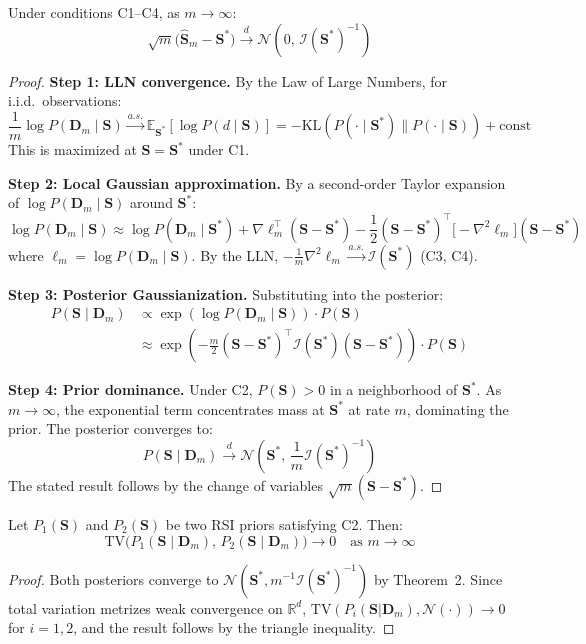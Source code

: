 \begin{theorem}
\label{thm:bvm_complete}
Under conditions C1--C4, as $m \to \infty$:
\[
  \sqrt{m}\bigl(\hat{\mathbf{S}}_m - \mathbf{S}^*\bigr)
  \xrightarrow{d} \mathcal{N}\!\left(0,\, \mathcal{I}(\mathbf{S}^*)^{-1}\right)
\]
\end{theorem}

\begin{proof}
\textbf{Step 1: LLN convergence.}
By the Law of Large Numbers, for i.i.d.\ observations:
\[
  \frac{1}{m} \log P(\mathbf{D}_m \mid \mathbf{S})
  \xrightarrow{a.s.} \mathbb{E}_{\mathbf{S}^*}[\log P(d \mid \mathbf{S})]
  = -\mathrm{KL}(P(\cdot \mid \mathbf{S}^*) \| P(\cdot \mid \mathbf{S}))
  + \text{const}
\]
This is maximized at $\mathbf{S} = \mathbf{S}^*$ under C1.

\textbf{Step 2: Local Gaussian approximation.}
By a second-order Taylor expansion of $\log P(\mathbf{D}_m \mid \mathbf{S})$
around $\mathbf{S}^*$:
\[
  \log P(\mathbf{D}_m \mid \mathbf{S}) \approx
  \log P(\mathbf{D}_m \mid \mathbf{S}^*)
  + \nabla \ell_m^\top (\mathbf{S} - \mathbf{S}^*)
  - \frac{1}{2}(\mathbf{S} - \mathbf{S}^*)^\top
  \bigl[-\nabla^2 \ell_m\bigr]
  (\mathbf{S} - \mathbf{S}^*)
\]
where $\ell_m = \log P(\mathbf{D}_m \mid \mathbf{S})$.
By the LLN, $-\frac{1}{m}\nabla^2 \ell_m \xrightarrow{a.s.}
\mathcal{I}(\mathbf{S}^*)$ (C3, C4).

\textbf{Step 3: Posterior Gaussianization.}
Substituting into the posterior:
\begin{align*}
  P(\mathbf{S} \mid \mathbf{D}_m)
  &\propto \exp\!\left(\log P(\mathbf{D}_m \mid \mathbf{S})\right) \cdot P(\mathbf{S}) \\
  &\approx \exp\!\left(-\frac{m}{2}(\mathbf{S}-\mathbf{S}^*)^\top
    \mathcal{I}(\mathbf{S}^*)
    (\mathbf{S}-\mathbf{S}^*)\right) \cdot P(\mathbf{S})
\end{align*}

\textbf{Step 4: Prior dominance.}
Under C2, $P(\mathbf{S}) > 0$ in a neighborhood of $\mathbf{S}^*$.
As $m \to \infty$, the exponential term concentrates mass at $\mathbf{S}^*$
at rate $m$, dominating the prior. The posterior converges to:
\[
  P(\mathbf{S} \mid \mathbf{D}_m)
  \xrightarrow{d} \mathcal{N}\!\left(\mathbf{S}^*,\,
  \frac{1}{m}\mathcal{I}(\mathbf{S}^*)^{-1}\right)
\]
The stated result follows by the change of variables
$\sqrt{m}(\mathbf{S} - \mathbf{S}^*)$.
\end{proof}

\begin{corollary}
Let $P_1(\mathbf{S})$ and $P_2(\mathbf{S})$ be two RSI priors satisfying C2.
Then:
\[
  \mathrm{TV}\bigl(P_1(\mathbf{S} \mid \mathbf{D}_m),\,
  P_2(\mathbf{S} \mid \mathbf{D}_m)\bigr) \to 0
  \quad \text{as } m \to \infty
\]
\begin{proof}
Both posteriors converge to $\mathcal{N}(\mathbf{S}^*,
m^{-1}\mathcal{I}(\mathbf{S}^*)^{-1})$ by Theorem~2.
Since total variation metrizes weak convergence on $\mathbb{R}^d$,
$\mathrm{TV}(P_i(\mathbf{S}|\mathbf{D}_m), \mathcal{N}(\cdot)) \to 0$
for $i = 1,2$, and the result follows by the triangle inequality.
\end{proof}
\end{corollary}

